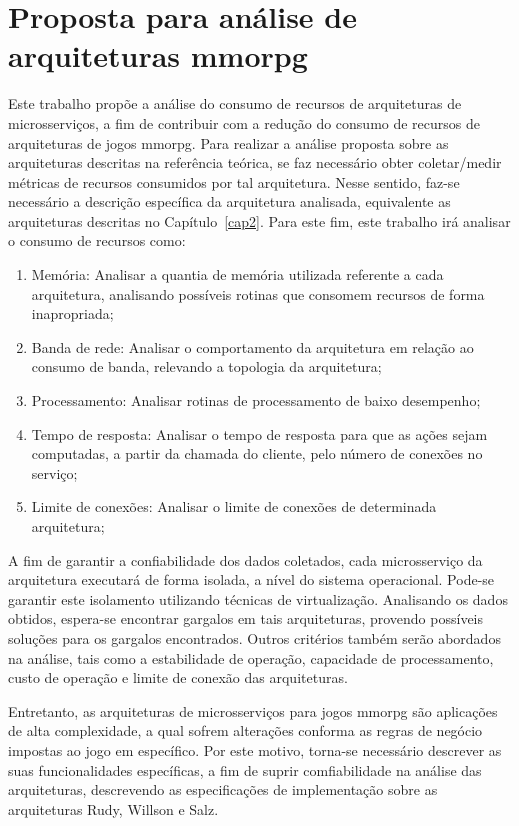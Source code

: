 \chapter{Proposta para análise de arquiteturas \ac{mmorpg}}
\label{cap3}

Este trabalho propõe a análise do consumo de recursos de arquiteturas de microsserviços, a fim de contribuir com a redução do consumo de recursos de arquiteturas de jogos \ac{mmorpg}.
%
Para realizar a análise proposta sobre as arquiteturas descritas na referência teórica, se faz necessário obter coletar/medir métricas de recursos consumidos por tal arquitetura.
%
Nesse sentido, faz-se necessário a descrição específica da arquitetura analisada, equivalente as arquiteturas descritas no Capítulo~\ref{cap2}.
%
Para este fim, este trabalho irá analisar o consumo de recursos como:

\begin{enumerate}
  \item{Memória: Analisar a quantia de memória utilizada referente a cada arquitetura, analisando possíveis rotinas que consomem recursos de forma inapropriada;}
  \item{Banda de rede: Analisar o comportamento da arquitetura em relação ao consumo de banda, relevando a topologia da arquitetura;}
  \item{Processamento: Analisar rotinas de processamento de baixo desempenho;}
  \item{Tempo de resposta: Analisar o tempo de resposta para que as ações sejam computadas, a partir da chamada do cliente, pelo número de conexões no serviço;}
  \item{Limite de conexões: Analisar o limite de conexões de determinada arquitetura;}
\end{enumerate}

A fim de garantir a confiabilidade dos dados coletados, cada microsserviço da arquitetura executará de forma isolada, a nível do sistema operacional.
%
Pode-se garantir este isolamento utilizando técnicas de virtualização.
%
Analisando os dados obtidos, espera-se encontrar gargalos em tais arquiteturas, provendo possíveis soluções para os gargalos encontrados.
%
Outros critérios também serão abordados na análise, tais como a estabilidade de operação, capacidade de processamento, custo de operação e limite de conexão das arquiteturas.
%

Entretanto, as arquiteturas de microsserviços para jogos \ac{mmorpg} são aplicações de alta complexidade, a qual sofrem alterações conforma as regras de negócio impostas ao jogo em específico.
%
Por este motivo, torna-se necessário descrever as suas funcionalidades específicas, a fim de suprir comfiabilidade na análise das arquiteturas, descrevendo as especificações de implementação sobre as arquiteturas Rudy, Willson e Salz.

